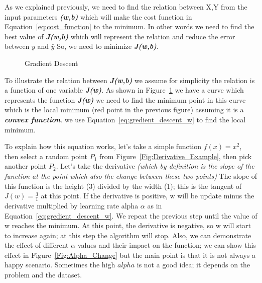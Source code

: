 As we explained previously, we need to find the relation between X,Y from the input parameters \textbf{\textit{(w,b)}} which will make the cost function in Equation~\eqref{eq:cost_function} to the minimum. In other words we need to find the best value of \textbf{\textit{J(w,b)}} which will represent the relation and reduce the error between $y$ and $\widehat{y}$ So, we need to minimize \textbf{\textit{J(w,b)}}.%
%
\begin{figure}[t]
\begin{center}

\caption{Gradient Descent}\label{Fig:gradient_decent_surf}
\end{center}
\end{figure}%
%
To illustrate the relation between \textbf{\textit{J(w,b)}} we assume for simplicity the relation is a function of one variable \textbf{\textit{J(w)}}. As shown in Figure~\ref{Fig:gradient_decent_surf} we have a curve which represents the function \textbf{\textit{J(w)}} we need to find the minimum point in this curve which is the local minimum (red point in the previous figure) assuming it is a \textbf{\textit{convex function}}. we use Equation~\eqref{eq:gredient_descent_w} to find the local minimum.

To explain how this equation works, let's take a simple function $f(x) = x^2$, then select a random point $P_1$ from Figure~\ref{Fig:Derivative_Example}, then pick another point $P_2$. Let's take the derivative \textit{(which by definition is the slope of the function at the point which also the change between these two points)} The slope of this function is the height (3) divided by the width (1); this is the tangent of $J(w)=\frac{3}{1}$ at this point. If the derivative is positive, w will be update minus the derivative multiplied by learning rate alpha $\alpha$ as in Equation~\eqref{eq:gredient_descent_w}. We repeat the previous step until the value of w reaches the minimum. At this point, the derivative is negative, so w will start to increase again; at this step the algorithm will stop. Also, we can demonstrate the effect of different $\alpha$ values and their impact on the function; we can show this effect in Figure~\ref{Fig:Alpha_Change} but the main point is that it is not always a happy scenario. Sometimes the high $alpha$ is not a good idea; it depends on the problem and the dataset.

